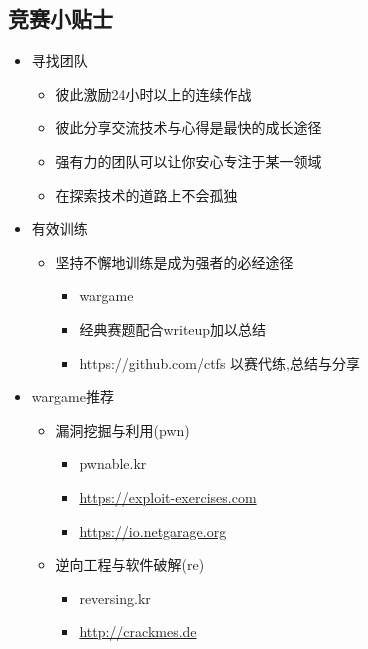 \subsection{竞赛小贴士}
\indent \setlength{\parindent}{2em}
\begin{itemize}
    \item 寻找团队
    \begin{itemize}
        \item 彼此激励24小时以上的连续作战
        \item 彼此分享交流技术与心得是最快的成长途径
        \item 强有力的团队可以让你安心专注于某一领域
        \item 在探索技术的道路上不会孤独
    \end{itemize}
    
    \item 有效训练
    \begin{itemize}
        \item 坚持不懈地训练是成为强者的必经途径
        \begin{itemize}
            \item wargame
            \item 经典赛题配合writeup加以总结
            \item https://github.com/ctfs 以赛代练,总结与分享
        \end{itemize}
    \end{itemize}
    \item wargame推荐
    \begin{itemize}
        \item 漏洞挖掘与利用(pwn)
        \begin{itemize}
            \item pwnable.kr
            \item \href{https://exploit-exercises.com}{https://exploit-exercises.com}
            \item \href{https://io.netgarage.org}{https://io.netgarage.org}
        \end{itemize}
        
        \item 逆向工程与软件破解(re)
        \begin{itemize}
            \item reversing.kr
            \item \href{http://crackmes.de}{http://crackmes.de}
        \end{itemize}
        

\end{itemize}
\end{itemize}
